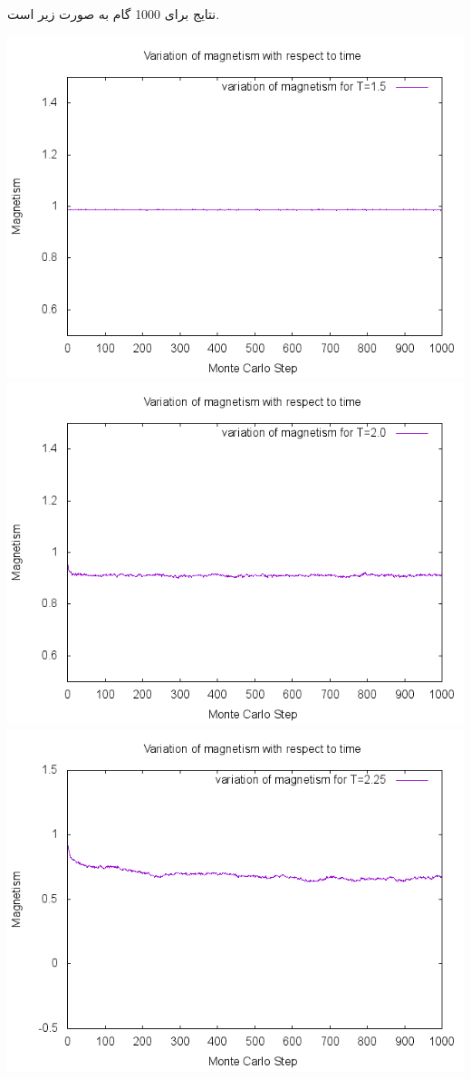 \documentclass[a4paper,12pt]{article}
\begin{document}
نتایج برای 1000 گام به صورت زیر است.

\begin{center}
 \includegraphics[scale=.8]{15A.png}
\includegraphics[scale=.8]{20A.png}
\includegraphics[scale=.8]{225A.png}

\end{center}
\end{document}
